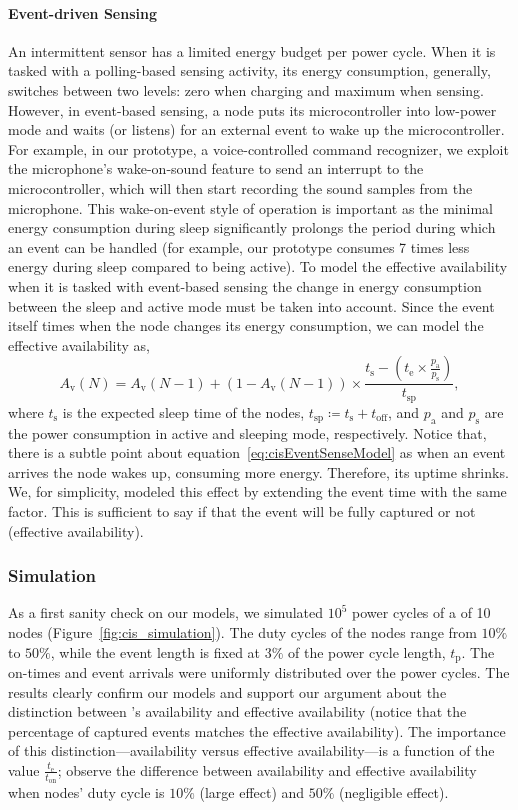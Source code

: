 \paragraph{Event-driven Sensing}
An intermittent sensor has a limited energy budget per power cycle. When it is tasked with a polling-based sensing activity, its energy consumption, generally, switches between two levels: zero when charging and maximum when sensing. However, in event-based sensing, a node puts its microcontroller into low-power mode and waits (or listens) for an external event to wake up the microcontroller. For example, in our prototype, a voice-controlled command recognizer, we exploit the microphone's wake-on-sound feature to send an interrupt to the microcontroller, which will then start recording the sound samples from the microphone. 
This wake-on-event style of operation is important as the minimal energy consumption during sleep significantly prolongs the period during which an event can be handled (for example, our prototype consumes 7 times less energy during sleep compared to being active).
To model the effective \cis availability when it is tasked with event-based sensing the change in energy consumption between the sleep and active mode must be taken into account. Since the event itself times when the node changes its energy consumption, we can model the effective availability as,
\begin{equation}
		A_\text{v}(N) = A_\text{v}(N-1) + \left(1-A_\text{v}(N-1)\right) \times \frac{t_\text{s} - (t_\text{e} \times\frac{p_\text{a}}{p_\text{s}}) }{t_\text{sp}},
		\label{eq:cisEventSenseModel}
\end{equation}
%
where $t_\text{s}$ is the expected sleep time of the \cis nodes, 
 $t_\text{sp} \coloneqq t_\text{s} + t_\text{off}$, 
 and $p_\text{a}$ and $p_\text{s}$ are the power consumption in active and sleeping mode, respectively.
 Notice that, there is a subtle point about equation~\ref{eq:cisEventSenseModel} as when an event arrives the node wakes up, consuming more energy. Therefore, its uptime shrinks. We, for simplicity, modeled this effect by extending the event time with the same factor. This is sufficient to say if that the event will be fully captured or not (effective availability).
%
\subsubsection{Simulation}
As a first sanity check on our models, we simulated $10^5$ power cycles of a \cis of 10 nodes (Figure~\ref{fig:cis_simulation}). The duty cycles of the nodes range from $10\%$ to $50\%$, while the event length is fixed at $3\%$ of the power cycle length, $t_\text{p}$. The on-times and event arrivals were uniformly distributed over the power cycles. 
The results clearly confirm our models and support our argument about the distinction between \cis's availability and effective availability (notice that the percentage of captured events matches the effective availability). 
The importance of this distinction---availability versus effective availability---is a function of the value $\frac{t_\text{e}}{t_\text{on}}$; observe the difference between availability and effective availability when nodes' duty cycle is $10\%$ (large effect) and $50\%$ (negligible effect).
%
%
